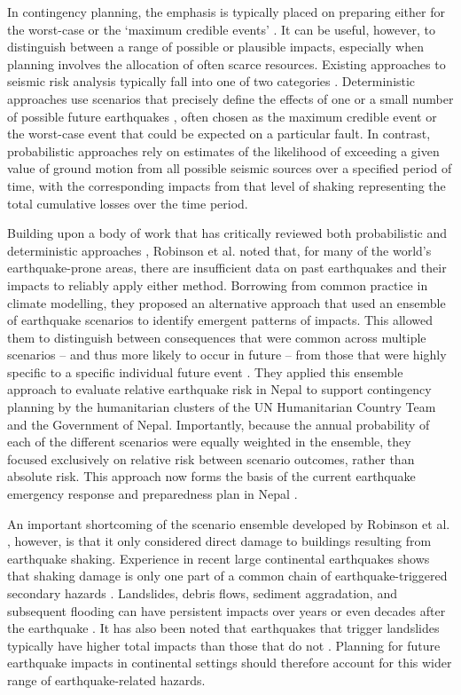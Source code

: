 \documentclass[preprint,12pt,authoryear]{elsarticle}
\begin{document}
In contingency planning, the emphasis is typically placed on preparing either for the worst-case or the `maximum credible events' \citep[e.g.,][]{klugel_seismic_2008}. It can be useful, however, to distinguish between a range of possible or plausible impacts, especially when planning involves the allocation of often scarce resources. Existing approaches to seismic risk analysis typically fall into one of two categories \citep{Robinson2018, mcguire_deterministic_2001}. Deterministic approaches use scenarios that precisely define the effects of one or a small number of possible future earthquakes \citep{Davies2015}, often chosen as the maximum credible event or the worst-case event that could be expected on a particular fault. In contrast, probabilistic approaches rely on estimates of the likelihood of exceeding a given value of ground motion from all possible seismic sources over a specified period of time, with the corresponding impacts from that level of shaking representing the total cumulative losses over the time period.

Building upon a body of work that has critically reviewed both probabilistic and deterministic approaches \citep{Bommer2002,Wang2003,Wang2011,Bilham2013, klugel_seismic_2008}, Robinson et al. \citep{Robinson2018} noted that, for many of the world's earthquake-prone areas, there are insufficient data on past earthquakes and their impacts to reliably apply either method. Borrowing from common practice in climate modelling, they proposed an alternative approach that used an ensemble of earthquake scenarios to identify emergent patterns of impacts. This allowed them to distinguish between consequences that were common across multiple scenarios -- and thus more likely to occur in future -- from those that were highly specific to a specific individual future event \citep{Robinson2018}. They applied this ensemble approach to evaluate relative earthquake risk in Nepal to support contingency planning by the humanitarian clusters of the UN Humanitarian Country Team and the Government of Nepal. Importantly, because the annual probability of each of the different scenarios were equally weighted in the ensemble, they focused exclusively on relative risk between scenario outcomes, rather than absolute risk. This approach now forms the basis of the current earthquake emergency response and preparedness plan in Nepal \citep{un_nepal2022earthquake}.

An important shortcoming of the scenario ensemble developed by Robinson et al. \citep{Robinson2018}, however, is that it only considered direct damage to buildings resulting from earthquake shaking. Experience in recent large continental earthquakes shows that shaking damage is only one part of a common chain of earthquake-triggered secondary hazards \citep{Gill2014}. Landslides, debris flows, sediment aggradation, and subsequent flooding can have persistent impacts over years or even decades after the earthquake \citep{Fan2019,Kincey2021, francis_fate_2022}. It has also been noted that earthquakes that trigger landslides typically have higher total impacts than those that do not \citep{Budimir2014}. Planning for future earthquake impacts in continental settings should therefore account for this wider range of earthquake-related hazards.
\end{document}
